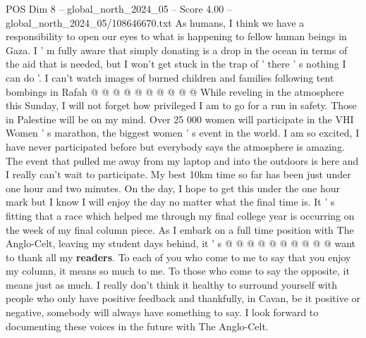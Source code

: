 \begin{textsample}{POS Dim 8 – global\_north\_2024\_05 – Score 4.00 – global\_north\_2024\_05/108646670.txt}
As humans, I think we have a responsibility to open our eyes to what is happening to fellow human beings in Gaza.
I ' m fully aware that simply donating is a drop in the ocean in terms of the aid that is needed, but I won't get stuck in the trap of ' there ' s nothing I can do '.
I can't watch images of burned children and families following tent bombings in Rafah @ @ @ @ @ @ @ @ @ @ While reveling in the atmosphere this Sunday, I will not forget how privileged I am to go for a run in safety.
Those in Palestine will be on my mind.
Over 25 000 women will participate in the VHI Women ' s marathon, the biggest women ' s event in the world.
I am so excited, I have never participated before but everybody says the atmosphere is amazing.
The event that pulled me away from my laptop and into the outdoors is here and I really can't wait to participate.
My best 10km time so far has been just under one hour and two minutes.
On the day, I hope to get this under the one hour mark but I know I will enjoy the day no matter what the final time is.
It ' s fitting that a race which helped me through my final college year is occurring on the week of my final column piece.
As I embark on a full time position with The Anglo-Celt, leaving my student days behind, it ' s @ @ @ @ @ @ @ @ @ @ want to thank all my \textbf{readers}.
To each of you who come to me to say that you enjoy my column, it means so much to me.
To those who come to say the opposite, it means just as much.
I really don't think it healthy to surround yourself with people who only have positive feedback and thankfully, in Cavan, be it positive or negative, somebody will always have something to say.
I look forward to documenting these voices in the future with The Anglo-Celt.

\end{textsample}

